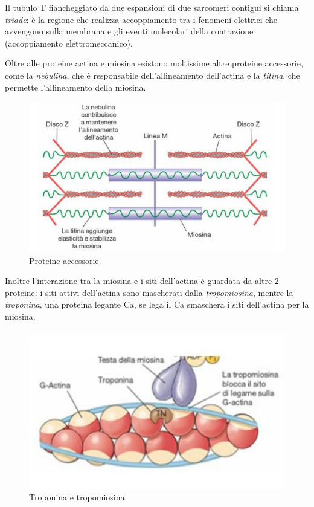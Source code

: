 \documentclass[a4paper,12pt]{article}
\begin{document}
Il tubulo T fiancheggiato da due espansioni di due sarcomeri contigui si chiama \emph{triade}: è la regione che realizza accoppiamento tra i fenomeni elettrici che avvengono sulla membrana e gli eventi molecolari della contrazione (accoppiamento elettromeccanico).

Oltre alle proteine actina e miosina esistono moltissime altre proteine accessorie, come la \emph{nebulina}, che è responsabile dell'allineamento dell'actina e la \emph{titina}, che permette l'allineamento della miosina. 

\begin{figure}[H]
\centering
\includegraphics[scale=0.5]{immagine/nebulina.jpg}
\caption{Proteine accessorie}
\end{figure}

Inoltre l'interazione tra la miosina e i siti dell'actina è guardata da altre 2 proteine: i siti attivi dell'actina sono mascherati dalla \emph{tropomiosina}, mentre la \emph{troponina}, una proteina legante Ca, se lega il Ca smaschera i siti dell'actina per la miosina.

\begin{figure}[H]
\centering
\includegraphics[scale=0.5]{immagine/troponina.jpg}
\caption{Troponina e tropomiosina}
\end{figure}
\end{document}
